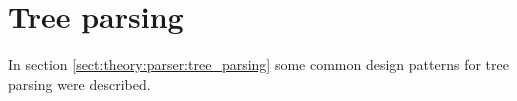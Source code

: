 \section{Tree parsing}
\label{sect:method:evaluated_methods}
In section \ref{sect:theory:parser:tree_parsing} some common design patterns
for tree parsing were described. 

